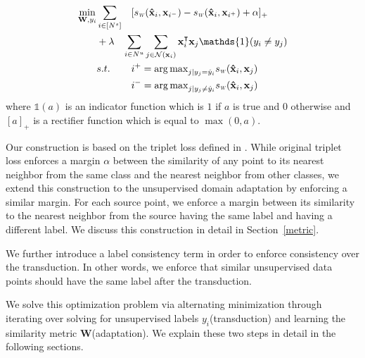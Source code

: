 \begin{equation}
\begin{aligned}
\min_{\mathbf{W}, y_i} &\sum_{i \in [N^s]} &&[\sw(\xsi,\mathbf{x}_{i^-}) - \sw(\xsi,\mathbf{x}_{i^+}) + \alpha]_{+}  \\
&+\lambda &&\hspace{-3mm}\sum_{i \in N^u} \sum_{j \in \mathcal{N}(\xui)}  \xui^\intercal \xuj \mathds{1}(y_i \neq y_j)\\
&s.t. \quad &&i^{+} = {\arg\max}_{j | y_j = \hat{y}_i} \sw(\mathbf{\hat{x}}_i,\mathbf{x}_{j}) \\
&\quad &&i^{-} = {\arg\max}_{j | y_j \neq \hat{y}_i} \sw(\mathbf{\hat{x}}_i,\mathbf{x}_{j}) 
\end{aligned}
\label{loss}
\end{equation}
where $\mathds{1}(a)$ is an indicator function which is $1$ if $a$ is true and $0$ otherwise and $[a]_+$ is a rectifier function which is equal to $\max(0, a)$. 

Our construction is based on the triplet loss defined in \cite{lmnn}. While original triplet loss \cite{lmnn} enforces a margin $\alpha$ between the similarity of any point to its nearest neighbor from the same class and the nearest neighbor from other classes, we extend this construction to the unsupervised domain adaptation by enforcing a similar margin. For each source point, we enforce a margin between its similarity to the nearest neighbor from the source having the same label and having a different label. We discuss this construction in detail in Section~\ref{metric}.

We further introduce a label consistency term in order to enforce consistency over the transduction. In other words, we enforce that similar unsupervised data points should have the same label after the transduction. 

We solve this optimization problem via alternating minimization through iterating over solving for unsupervised labels $y_i$(transduction) and learning the similarity metric $\mathbf{W}$(adaptation). We explain these two steps in detail in the following sections.

 


